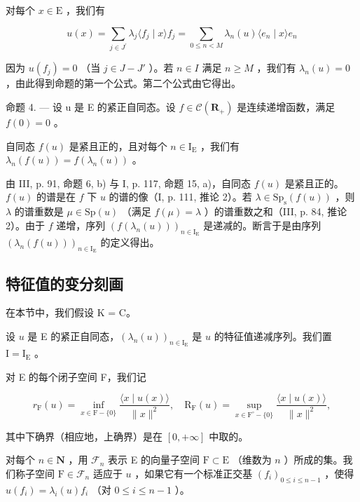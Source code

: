 对每个 \(x \in \mathrm{E}\) ，我们有

\[
u (x) = \sum_ {j \in J ^ {\prime}} \lambda_ {j} \langle f _ {j} \mid x \rangle f _ {j} = \sum_ {0 \leqslant n <   M} \lambda_ {n} (u) \langle e _ {n} \mid x \rangle e _ {n}
\]

因为 \(u(f_{j}) = 0\) （当 \(j \in J - J'\) ）。若 \(n \in I\) 满足 \(n \geqslant M\) ，我们有 \(\lambda_{n}(u) = 0\) ，由此得到命题的第一个公式。第二个公式由它得出。

命题 4. --- 设 u 是 E 的紧正自同态。设 \(f \in \mathcal{C}(\mathbf{R}_{+})\) 是连续递增函数，满足 \(f(0) = 0\) 。

自同态 \(f(u)\) 是紧且正的，且对每个 \(n \in \mathrm{I}_{\mathrm{E}}\) ，我们有 \(\lambda_n(f(u)) = f(\lambda_n(u))\) 。

由 III, p. 91, 命题 6, b) 与 I, p. 117, 命题 15, a)，自同态 \(f(u)\) 是紧且正的。\(f(u)\) 的谱是在 \(f\) 下 \(u\) 的谱的像（I, p. 111, 推论 2）。若 \(\lambda \in \mathrm{Sp}_{\mathrm{s}}(f(u))\) ，则 \(\lambda\) 的谱重数是 \(\mu \in \mathrm{Sp}(u)\) （满足 \(f(\mu) = \lambda\) ）的谱重数之和（III, p. 84, 推论 2）。由于 \(f\) 递增，序列 \((f(\lambda_n(u)))_{n \in \mathrm{I_E}}\) 是递减的。断言于是由序列 \((\lambda_n(f(u)))_{n \in \mathrm{I_E}}\) 的定义得出。

\subsection{特征值的变分刻画}

在本节中，我们假设 K = C。

设 \(u\) 是 E 的紧正自同态，\((\lambda_n(u))_{n\in \mathrm{I_E}}\) 是 \(u\) 的特征值递减序列。我们置 \(\mathrm{I} = \mathrm{I_E}\) 。

对 E 的每个闭子空间 F，我们记

\[
r _ {\mathrm{F}} (u) = \inf _ {x \in \mathrm{F} - \{0 \}} \frac {\langle x \mid u (x) \rangle}{\| x \| ^ {2}}, \quad \mathrm{R} _ {\mathrm{F}} (u) = \sup _ {x \in \mathrm{F} ^ {\circ} - \{0 \}} \frac {\langle x \mid u (x) \rangle}{\| x \| ^ {2}},
\]

其中下确界（相应地，上确界）是在 \([0, +\infty]\) 中取的。

对每个 \(n \in \mathbf{N}\) ，用 \(\mathcal{F}_n\) 表示 E 的向量子空间 \(\mathrm{F} \subset \mathrm{E}\) （维数为 \(n\) ）所成的集。我们称子空间 \(\mathrm{F} \in \mathcal{F}_n\) 适应于 \(u\) ，如果它有一个标准正交基 \((f_i)_{0 \leqslant i \leqslant n-1}\) ，使得 \(u(f_i) = \lambda_i(u)f_i\) （对 \(0 \leqslant i \leqslant n-1\) ）。

